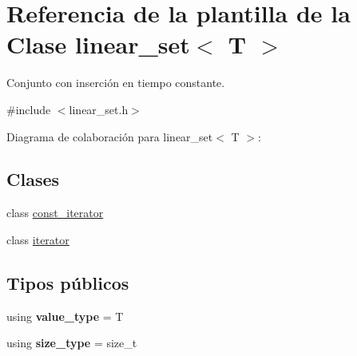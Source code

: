 \hypertarget{classlinear__set}{}\section{Referencia de la plantilla de la Clase linear\+\_\+set$<$ T $>$}
\label{classlinear__set}


Conjunto con inserción en tiempo constante.  




{\ttfamily \#include $<$linear\+\_\+set.\+h$>$}



Diagrama de colaboración para linear\+\_\+set$<$ T $>$\+:
\subsection*{Clases}
\begin{DoxyCompactItemize}
\item 
class \mbox{\hyperlink{classlinear__set_1_1const__iterator}{const\+\_\+iterator}}
\item 
class \mbox{\hyperlink{classlinear__set_1_1iterator}{iterator}}
\end{DoxyCompactItemize}
\subsection*{Tipos públicos}
\begin{DoxyCompactItemize}
\item 
\mbox{\label{classlinear__set_a3d7088f5ad3d506bc94ad0fa62c40fed}} 
using {\bfseries value\+\_\+type} = T
\item 
\mbox{\label{classlinear__set_a502855ac3cffe6a33ba8eed857bd14bf}} 
using {\bfseries size\+\_\+type} = size\+\_\+t
\end{DoxyCompactItemize}
